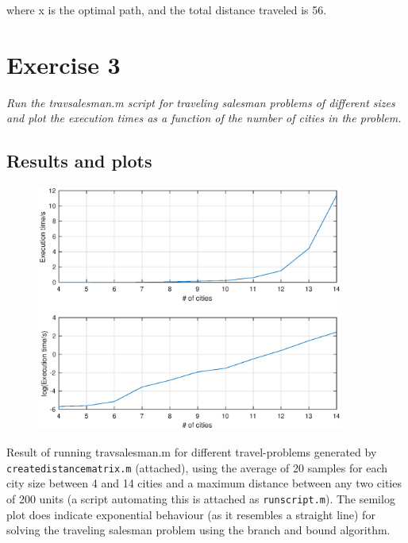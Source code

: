 \documentclass{article}
\begin{document}
  \noindent
  where x is the optimal path, and the total distance traveled is 56.

  \newpage

\section*{Exercise 3}

  \textit{Run the travsalesman.m script for traveling salesman problems of different
  sizes and plot the execution times as a function of the number of cities in
  the problem.}

  \subsection*{Results and plots}

  \begin{figure}[!h]
    \centering
    \includegraphics[width=0.9\textwidth]{4_14_20samples.eps}
  \end{figure}

  \noindent
  Result of running travsalesman.m for different travel-problems generated by
  \texttt{createdistancematrix.m} (attached), using the average of 20 samples for each city
  size between 4 and 14 cities and a maximum distance between any two cities of 200 units
  (a script automating this is attached as \texttt{runscript.m}). The semilog plot does indicate exponential behaviour (as it
  resembles a straight line)
  for solving the traveling salesman problem using the branch and bound algorithm.
\end{document}
